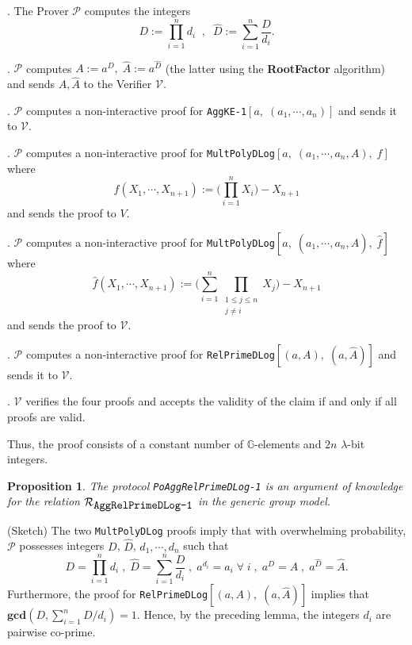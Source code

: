 \documentclass[11pt, lettersize, notitlepage, leqno, footskip=0.6cm]{article}
\newcommand{\pl}{\prod\limits}
\newcommand{\slim}{\sum\limits}
\newcommand{\mc}{\mathcal}
\newcommand{\mb}{\mathbb}
\newcommand{\mbf}{\mathbf}
\newcommand{\lam}{\lambda}
\newcommand{\what}{\widehat}
\newcommand{\mP}{\mc{P}}
\newcommand{\V}{\mc{V}}
\newcommand{\vs}{\vspace{-0.15cm}}
\newcommand{\noin}{\noindent}
\newcommand{\op}{overwhelming probability}
\newcommand{\GCD}{\mbf{gcd}}
\newtheorem{Prop}[Thm]{Proposition}
\numberwithin{equation}{section}
\begin{document}
\begin{prf1}. The Prover $\mP$ computes the integers \vs $$D:=\pl_{i=1}^n d_i\;\;,\;\; \what{D}:= \slim_{i=1}^n \frac{D}{d_i}.$$

\noin 2. $\mP$ computes $A:= a^D,\;\what{A}:= a^{\what{D}} $ (the latter using the \textbf{RootFactor} algorithm) and sends $A,\what{A}$ to the Verifier $\V$.

\noin 3. $\mP$ computes a non-interactive proof for \verb|AggKE-1|$[a,\;(a_1,\cdots,a_n)]$ and sends it to $\V$.

\noin 4. $\mP$ computes a non-interactive proof for \verb|MultPolyDLog|$[a,\;(a_1,\cdots,a_n,A),\; f]$ where \vs $$f(X_1,\cdots,X_{n+1}):= \big(\pl_{i=1}^n X_i\big) -X_{n+1}$$ and sends the proof to $V$.

\noin 5. $\mP$ computes a non-interactive proof for \verb|MultPolyDLog|$[a,\;(a_1,\cdots,a_n,\what{A}),\; \what{f}]$ where \vs $$\what{f}(X_1,\cdots, X_{n+1}):= \big(\slim_{i=1}^n \pl_{\substack{1\leq j\leq n \\ j\neq i}} X_j\big) - X_{n+1}$$ and sends the proof to $\V$.

\noin 6. $\mP$ computes a non-interactive proof for \verb|RelPrimeDLog|$[(a,A),\;(a,\what{A})]$ and sends it to $\V$.

\noin 7. $\V$ verifies the four proofs and accepts the validity of the claim if and only if all proofs are valid.\end{prf1}

\noin Thus, the proof consists of a constant number of $\mb{G}$-elements and $2n$ $\lam$-bit integers.

\begin{Prop} The protocol \verb|PoAggRelPrimeDLog-1| is an argument of knowledge for the relation $\mc{R}_{{\protect\verb|AggRelPrimeDLog-1|}}$ in the generic group model.\end{Prop}

\begin{prf} (Sketch) The two \verb|MultPolyDLog| proofs imply that with \op, $\mP$ possesses integers $D$, $\what{D}$, $d_1,\cdots,d_n$ such that \vs $$D = \pl_{i=1}^n d_i\;,\;\what{D} = \slim_{i=1}^n \frac{D}{d_i}   \;,\;a^{d_i} = a_i\;\forall\;i \;,\;a^{D} = A\;,\; a^{\what{D}} = \what{A} .$$ Furthermore, the proof for \verb|RelPrimeDLog|$[(a,A),\;(a,\what{A})]$ implies that $\GCD(D,\slim_{i=1}^n D/d_i) = 1$. Hence, by the preceding lemma, the integers $d_i$ are pairwise co-prime.\end{prf}
\end{document}
